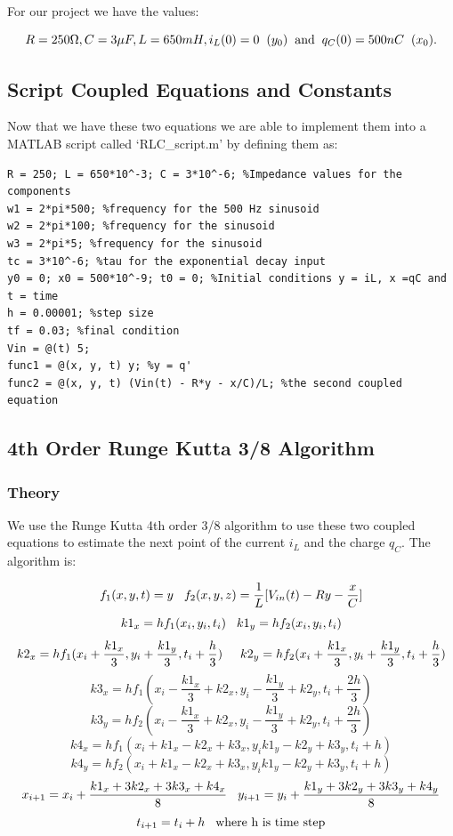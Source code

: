 \documentclass[11pt,a4paper]{article}
\begin{document}
For our project we have the values:

\[R = 250 \Omega, C = 3 \mu F , L = 650 mH, i_L(0) = 0 \hspace{2mm} (y_0) \text{\hspace{2mm}and\hspace{2mm}} q_C(0) = 500nC \hspace{2mm} (x_0).\]

\subsection{Script Coupled Equations and Constants}

Now that we have these two equations we are able to implement them into a MATLAB script called `RLC\_script.m' by defining them as:

\begin{verbatim}
R = 250; L = 650*10^-3; C = 3*10^-6; %Impedance values for the components
w1 = 2*pi*500; %frequency for the 500 Hz sinusoid
w2 = 2*pi*100; %frequency for the sinusoid
w3 = 2*pi*5; %frequency for the sinusoid
tc = 3*10^-6; %tau for the exponential decay input
y0 = 0; x0 = 500*10^-9; t0 = 0; %Initial conditions y = iL, x =qC and t = time
h = 0.00001; %step size
tf = 0.03; %final condition
Vin = @(t) 5;
func1 = @(x, y, t) y; %y = q'
func2 = @(x, y, t) (Vin(t) - R*y - x/C)/L; %the second coupled equation
\end{verbatim}

\subsection{4th Order Runge Kutta 3/8 Algorithm}
\subsubsection{Theory}

We use the Runge Kutta 4th order 3/8 algorithm to use these two coupled equations to estimate the next point of the current $i_L$ and the charge $q_C$. The algorithm is:

\[f_1(x,y,t) = y \hspace{3mm} f_2(x,y,z) = \frac{1}{L}[V_{in}(t) - Ry - \frac{x}{C}]\]
\[k1_x = hf_1(x_i,y_i,t_i) \hspace{3mm} k1_y = hf_2(x_i,y_i,t_i)\]
\[k2_x = hf_1(x_i+\frac{k1_x}{3},y_i+\frac{k1_y}{3},t_i+\frac{h}{3}) \hspace{5mm} k2_y = hf_2(x_i+\frac{k1_x}{3},y_i+\frac{k1_y}{3},t_i+\frac{h}{3})\]
\[k3_x = hf_1(x_i-\frac{k1_x}{3}+k2_x,y_i-\frac{k1_y}{3}+k2_y,t_i+\frac{2h}{3}) \]
\[k3_y = hf_2(x_i-\frac{k1_x}{3}+k2_x,y_i-\frac{k1_y}{3}+k2_y,t_i+\frac{2h}{3})\]
\[k4_x = hf_1(x_i+k1_x-k2_x+k3_x,y_ik1_y-k2_y+k3_y,t_i+h) \]
\[k4_y = hf_2(x_i+k1_x-k2_x+k3_x,y_ik1_y-k2_y+k3_y,t_i+h)\]
\[x_{i+1} =x_i+\frac{k1_x+3k2_x+3k3_x+k4_x}{8} \hspace{3mm} y_{i+1} =y_i+\frac{k1_y+3k2_y+3k3_y+k4_y}{8}\]
\[t_{i+1} = t_i + h \hspace{3mm} \text{where h is time step}\]
\end{document}
